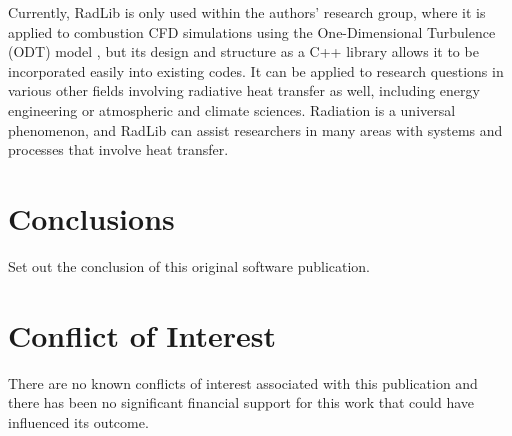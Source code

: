 \documentclass[preprint,12pt, a4paper]{elsarticle}
\begin{document}
Currently, RadLib is only used within the authors' research group, where it is applied to combustion CFD simulations using the One-Dimensional Turbulence (ODT) model \cite{Stephens_2020}, but its design and structure as a C++ library allows it to be incorporated easily into existing codes. It can be applied to  research questions in various other fields involving radiative heat transfer as well, including energy engineering or atmospheric and climate sciences. Radiation is a universal phenomenon, and RadLib can assist researchers in many areas with systems and processes that involve heat transfer. 



\section{Conclusions} \label{s:conclusions}

Set out the conclusion of this original software publication.


\section{Conflict of Interest} \label{s:coi}

There are no known conflicts of interest associated with this publication and there has been no significant financial support for     this work that could have influenced its outcome.
\end{document}
